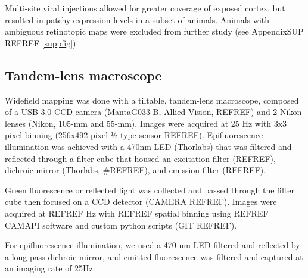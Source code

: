 Multi-site viral injections allowed for greater coverage of exposed cortex, but resulted in patchy expression levels in a subset of animals. Animals with ambiguous retinotopic maps were excluded from further study (see AppendixSUP REFREF \ref{suppfig}).

\subsection{Tandem-lens macroscope}
Widefield mapping was done with a tiltable, tandem-lens macroscope\cite{Ratzlaff1991, Kalatsky2003}, composed of a USB 3.0 CCD camera (MantaG033-B, Allied Vision, REFREF) and 2 Nikon lenses (Nikon, 105-mm and 55-mm). Images were acquired at 25 Hz with 3x3 pixel binning (256x492 pixel ½-type sensor REFREF). Epifluorescence illumination was achieved with a 470nm LED (Thorlabs) that was filtered and reflected through a filter cube that housed an excitation filter (REFREF), dichroic mirror (Thorlabs, #REFREF), and emission filter (REFREF). 

Green fluorescence or reflected light was collected and passed through the filter cube then focused on a CCD detector (CAMERA REFREF). Images were acquired at REFREF Hz with REFREF spatial binning using REFREF CAMAPI software and custom python scripts (GIT REFREF). 

For epifluorescence illumination, we used a 470 nm LED filtered and reflected by a long-pass dichroic mirror, and emitted fluorescence was filtered and captured at an imaging rate of 25Hz. 


